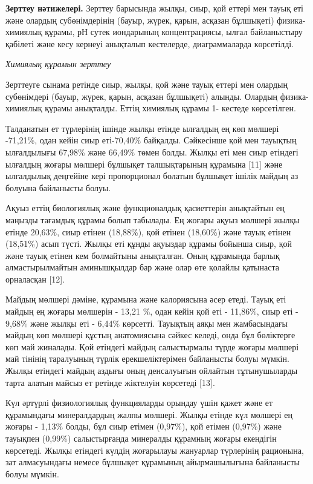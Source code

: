 \begin{multicols}{2}
{\bfseries Зерттеу нәтижелері.} Зерттеу барысында жылқы, сиыр, қой еттері
мен тауық еті және олардың субөнімдерінің (бауыр, жүрек, қарын, асқазан
бұлшықеті) физика-химиялық құрамы, рН сутек иондарының концентрациясы,
ылғал байланыстыру қабілеті және кесу кернеуі анықталып кестелерде,
диаграммаларда көрсетілді.

\emph{Химиялық құрамын зерттеу}

Зерттеуге сынама ретінде сиыр, жылқы, қой және тауық еттері мен олардың
субөнімдері (бауыр, жүрек, қарын, асқазан бұлшықеті) алынды. Олардың
физика-химиялық құрамы анықталды. Еттің химиялық құрамы 1- кестеде
көрсетілген.

Талданатын ет түрлерінің ішінде жылқы етінде ылғалдың ең көп мөлшері
-71,21\%, одан кейін сиыр еті-70,40\% байқалды. Сәйкесінше қой мен
тауықтың ылғалдылығы 67,98\% және 66,49\% төмен болды. Жылқы еті мен
сиыр етіндегі ылғалдың жоғары мөлшері бұлшықет талшықтарының құрамына
{[}11{]} және ылғалдылық деңгейіне кері пропорционал болатын бұлшықет
ішілік майдың аз болуына байланысты болуы.

Ақуыз еттің биологиялық және функционалдық қасиеттерін анықтайтын ең
маңызды тағамдық құрамы болып табылады. Ең жоғары ақуыз мөлшері жылқы
етінде 20,63\%, сиыр етінен (18,88\%), қой етінен (18,60\%) және тауық
етінен (18,51\%) асып түсті. Жылқы еті құнды ақуыздар құрамы бойынша
сиыр, қой және тауық етінен кем болмайтыны анықталған. Оның құрамында
барлық алмастырылмайтын аминышқылдар бар және олар өте қолайлы қатынаста
орналасқан {[}12{]}.

Майдың мөлшері дәміне, құрамына және калориясына әсер етеді. Тауық еті
майдың ең жоғары мөлшерін - 13,21 \%, одан кейін қой еті - 11,86\%, сиыр
еті - 9,68\% және жылқы еті - 6,44\% көрсетті. Тауықтың аяқы мен
жамбасындағы майдың көп мөлшері құстың анатомиясына сәйкес келеді, онда
бұл бөліктерге көп май жиналады. Қой етіндегі майдың салыстырмалы түрде
жоғары мөлшері май тінінің таралуының түрлік ерекшеліктерімен байланысты
болуы мүмкін. Жылқы етіндегі майдың аздығы оның денсалуығын ойлайтын
тұтынушыларды тарта алатын майсыз ет ретінде жіктелуін көрсетеді
{[}13{]}.

Күл әртүрлі физиологиялық функцияларды орындау үшін қажет және ет
құрамындағы минералдардың жалпы мөлшері. Жылқы етінде күл мөлшері ең
жоғары - 1,13\% болды, бұл сиыр етімен (0,97\%), қой етімен (0,97\%)
және тауықпен (0,99\%) салыстырғанда минералды құрамның жоғары екендігін
көрсетеді. Жылқы етіндегі күлдің жоғарылауы жануарлар түрлерінің
рационына, зат алмасуындағы немесе бұлшықет құрамының айырмашылығына
байланысты болуы мүмкін.


\end{multicols}

